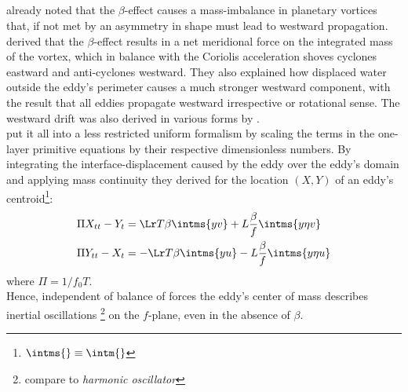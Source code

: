 \subsection{\citealt{Cushman-Roisin1990}}\label{sec:hist_cush}
\cite{Bjerknes1944} already noted that the $\beta$-effect causes a mass-imbalance in planetary vortices that, if not met by an asymmetry in shape must lead to westward propagation. \cite{Nof1981} derived that the $\beta$-effect results in a net meridional force on the integrated mass of the vortex, which in balance with the Coriolis acceleration shoves cyclones eastward and anti-cyclones westward. They also explained how displaced water outside the eddy's perimeter causes a much stronger westward component, with the result that all eddies propagate westward irrespective or rotational sense. The westward drift was also derived in various forms by
\eg \cite{flierl1984rossby,matsuura1982evolution}. \\
\citet{Cushman-Roisin1990} put it all into a less restricted uniform formalism by scaling the terms in the one-layer primitive equations by their respective dimensionless numbers. By integrating the interface-displacement caused by the eddy over the eddy's domain and applying mass continuity they derived for the location $(X,Y)$ of an eddy's centroid\footnote{$\intms{}\equiv \intm{}$}:
\begin{equation}\begin{split}
	\Pi X_{tt} - Y_t
	&=
	\Lr T \beta     \intms{yv}
	+
	L\frac{  \beta  }{ f   } \intms{y\eta v}\\
	\Pi Y_{tt} - X_t
	&=
	-\Lr T \beta   \intms{yu}
	-
	L\frac{  \beta  }{ f   }  \intms{y\eta u} 	  \label{eq:cush1}
\end{split}\end{equation}
where $\Pi=1/f_0T$.\\
 Hence, independent of balance of forces the eddy's center of mass describes inertial oscillations \footnote{compare to \textit{harmonic oscillator}} on the $f$-plane, even in the absence of $\beta$.
